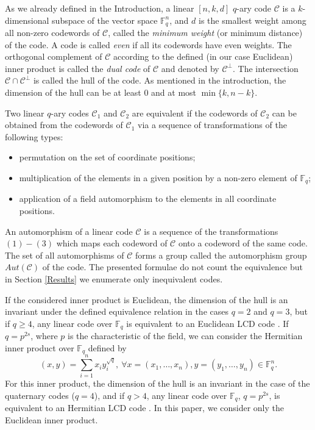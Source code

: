 \documentclass[a4paper,11pt]{article}
\newcommand{\F}{\mathbb{F}}
\begin{document}
As we already defined in the Introduction, a linear $[n,k,d]$ $q$-ary code $\mathcal{C}$ is a $k$-dimensional subspace of the
vector space $\F_q^n$, and $d$ is the
smallest weight among all non-zero codewords of $\mathcal{C}$, called the \textit{minimum weight} (or minimum distance) of the code. A code is called {\em even} if all its codewords have even weights. The orthogonal complement of $\mathcal{C}$ according to the defined (in our case Euclidean) inner product is called the \textit{dual code} of $\mathcal{C}$ and denoted by $\mathcal{C}^{\perp}$. The intersection $\mathcal{C}\cap \mathcal{C}^\perp$ is called the hull of the code. As mentioned in the introduction, the dimension of the hull can be at least 0 and at most $\min\{k,n-k\}$.


Two linear $q$-ary codes $\mathcal{C}_1$ and $\mathcal{C}_2$ are equivalent if the codewords of $\mathcal{C}_2$ can be obtained from
the codewords of $\mathcal{C}_1$ via a sequence of transformations of the
following types:
\begin{itemize}
\item[(1)] permutation on the set of coordinate positions;
\item[(2)] multiplication of the elements in a given position by a
non-zero element of $\F_q$;
\item[(3)] application of a field automorphism to the elements in all
coordinate positions.
\end{itemize}
An automorphism of a linear code $\mathcal{C}$ is a sequence of the
transformations $(1)-(3)$ which maps
each codeword of $\mathcal{C}$ onto a codeword of the same code. The set of all automorphisms of $\mathcal{C}$ forms a group called the automorphism group $Aut(\mathcal{C})$ of the code. The presented formulae do not count the equivalence but in Section \ref{Results} we enumerate only inequivalent codes.

If the considered inner product is Euclidean, the dimension of the hull  is an invariant under the defined equivalence relation in the cases $q = 2$ and $q = 3$, but if $q\ge 4$, any linear code over
$\F_q$ is equivalent to an Euclidean LCD code \cite{Carlet_Pellikaan}. If $q=p^{2s}$, where $p$ is the characteristic of the field, we can consider the Hermitian inner product over $\F_q$ defined by $$(x,y)=\sum_{i=1}^n x_iy_i^{\sqrt{q}}, \ \forall x=(x_1,\ldots,x_n), y=(y_1,\ldots,y_n)\in \F_q^n.$$
For this inner product, the dimension of the hull is an invariant in the case of the quaternary codes ($q=4$), and if $q>4$, any linear code over
$\F_q$, $q=p^{2s}$, is equivalent to an Hermitian LCD code \cite{Carlet_Pellikaan}. In this paper, we consider only the Euclidean inner product.
\end{document}
